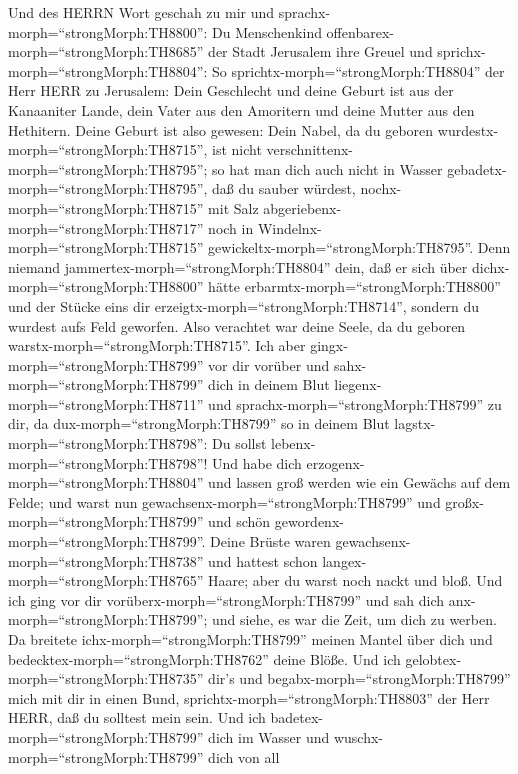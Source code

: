  Und des HERRN Wort geschah zu mir und
sprachx-morph=``strongMorph:TH8800'':  Du Menschenkind
offenbarex-morph=``strongMorph:TH8685'' der Stadt Jerusalem ihre Greuel
und sprichx-morph=``strongMorph:TH8804'':  So
sprichtx-morph=``strongMorph:TH8804'' der Herr HERR zu Jerusalem: Dein
Geschlecht und deine Geburt ist aus der Kanaaniter Lande, dein Vater aus
den Amoritern und deine Mutter aus den Hethitern.  Deine
Geburt ist also gewesen: Dein Nabel, da du geboren
wurdestx-morph=``strongMorph:TH8715'', ist nicht
verschnittenx-morph=``strongMorph:TH8795''; so hat man dich auch nicht
in Wasser gebadetx-morph=``strongMorph:TH8795'', daß du sauber würdest,
nochx-morph=``strongMorph:TH8715'' mit Salz
abgeriebenx-morph=``strongMorph:TH8717'' noch in
Windelnx-morph=``strongMorph:TH8715''
gewickeltx-morph=``strongMorph:TH8795''.  Denn niemand
jammertex-morph=``strongMorph:TH8804'' dein, daß er sich über
dichx-morph=``strongMorph:TH8800'' hätte
erbarmtx-morph=``strongMorph:TH8800'' und der Stücke eins dir
erzeigtx-morph=``strongMorph:TH8714'', sondern du wurdest aufs Feld
geworfen. Also verachtet war deine Seele, da du geboren
warstx-morph=``strongMorph:TH8715''.  Ich aber
gingx-morph=``strongMorph:TH8799'' vor dir vorüber und
sahx-morph=``strongMorph:TH8799'' dich in deinem Blut
liegenx-morph=``strongMorph:TH8711'' und
sprachx-morph=``strongMorph:TH8799'' zu dir, da
dux-morph=``strongMorph:TH8799'' so in deinem Blut
lagstx-morph=``strongMorph:TH8798'': Du sollst
lebenx-morph=``strongMorph:TH8798''!  Und habe dich
erzogenx-morph=``strongMorph:TH8804'' und lassen groß werden wie ein
Gewächs auf dem Felde; und warst nun
gewachsenx-morph=``strongMorph:TH8799'' und
großx-morph=``strongMorph:TH8799'' und schön
gewordenx-morph=``strongMorph:TH8799''. Deine Brüste waren
gewachsenx-morph=``strongMorph:TH8738'' und hattest schon
langex-morph=``strongMorph:TH8765'' Haare; aber du warst noch nackt und
bloß.  Und ich ging vor dir
vorüberx-morph=``strongMorph:TH8799'' und sah dich
anx-morph=``strongMorph:TH8799''; und siehe, es war die Zeit, um dich zu
werben. Da breitete ichx-morph=``strongMorph:TH8799'' meinen Mantel über
dich und bedecktex-morph=``strongMorph:TH8762'' deine Blöße. Und ich
gelobtex-morph=``strongMorph:TH8735'' dir's und
begabx-morph=``strongMorph:TH8799'' mich mit dir in einen Bund,
sprichtx-morph=``strongMorph:TH8803'' der Herr HERR, daß du solltest
mein sein.  Und ich badetex-morph=``strongMorph:TH8799''
dich im Wasser und wuschx-morph=``strongMorph:TH8799'' dich von all

